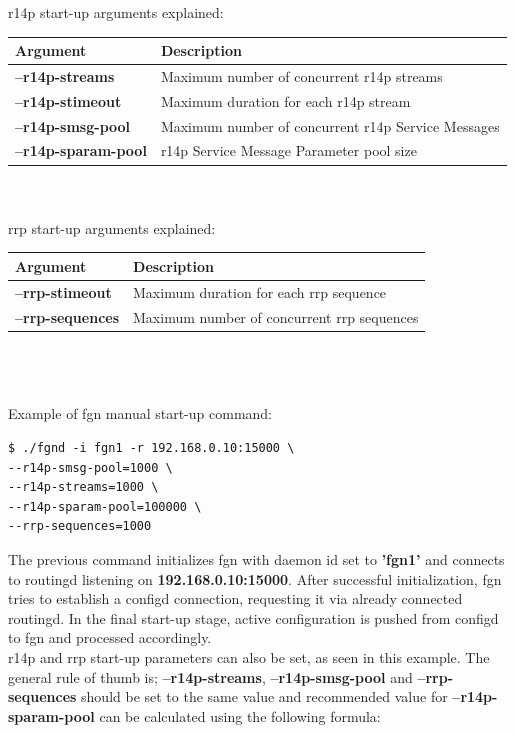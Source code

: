 \documentclass[a4paper,latin]{paper}
\begin{document}
\noindent{}\acrfull{r14p} start-up arguments explained:\\
\begin{tabularx}{\textwidth}{ | l | X | }
	\hline
	Argument 			& Description \\
	\hline
	\textbf{--r14p-streams}		& Maximum number of concurrent \acrshort{r14p} streams \\
	\textbf{--r14p-stimeout}	& Maximum duration for each \acrshort{r14p} stream \\
	\textbf{--r14p-smsg-pool}	& Maximum number of concurrent \acrshort{r14p} Service Messages \\
	\textbf{--r14p-sparam-pool}	& \acrshort{r14p} Service Message Parameter pool size \\
	\hline
\end{tabularx}\\\\

\noindent{}\acrfull{rrp} start-up arguments explained:\\
\begin{tabularx}{\textwidth}{ | l | X | }
	\hline
	Argument 			& Description \\
	\hline
	\textbf{--rrp-stimeout}		& Maximum duration for each \acrshort{rrp} sequence \\
	\textbf{--rrp-sequences}	& Maximum number of concurrent \acrshort{rrp} sequences \\
	\hline
\end{tabularx}\\\\\\
Example of \acrfull{fgn} manual start-up command:
\begin{lstlisting}[style=BashInputStyle, belowskip=\baselineskip]
$ ./fgnd -i fgn1 -r 192.168.0.10:15000 \
--r14p-smsg-pool=1000 \
--r14p-streams=1000 \
--r14p-sparam-pool=100000 \
--rrp-sequences=1000
\end{lstlisting}
The previous command initializes \acrfull{fgn} with \gls{daemon} id set to \textbf{'fgn1'} and connects to \acrfull{routingd} 
listening on \textbf{192.168.0.10:15000}. After successful initialization, \acrshort{fgn} tries to establish a 
\acrshort{configd} connection, requesting it via already connected \acrshort{routingd}. 
In the final start-up stage, active configuration is pushed from \acrshort{configd} to \acrshort{fgn} and processed accordingly.\\

\noindent{}\acrshort{r14p} and \acrshort{rrp} start-up parameters can also be set, as seen in this example. 
The general rule of thumb is; \textbf{--r14p-streams}, \textbf{--r14p-smsg-pool} and \textbf{--rrp-sequences} 
should be set to the same value and recommended value for \textbf{--r14p-sparam-pool} can be calculated using the following formula: 
\end{document}
